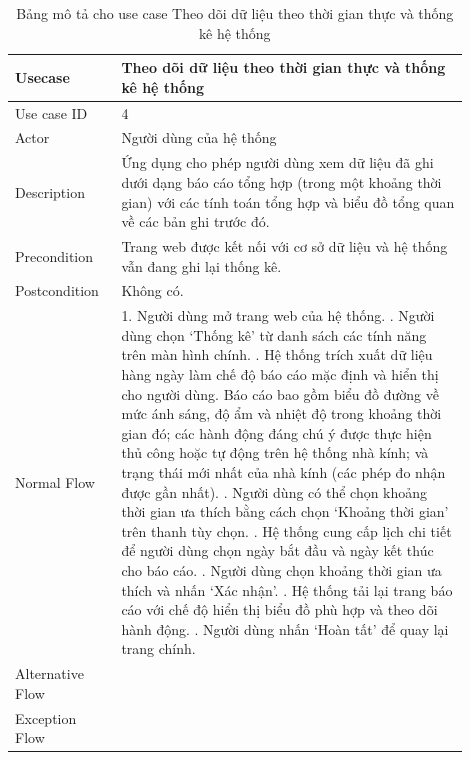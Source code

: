 \begin{table}[H]
\centering
\begin{tabular}{|p{0.2\linewidth}|p{0.7\linewidth}|}
\hline
\rowcolor[HTML]{EFEFEF} 
\textbf{Usecase}        & \textbf{Theo dõi dữ liệu theo thời gian thực và thống kê hệ thống} \\ \hline
Use case ID             & 4 \\ \hline
Actor                   & Người dùng của hệ thống \\ \hline
Description             & Ứng dụng cho phép người dùng xem dữ liệu đã ghi dưới dạng báo cáo tổng hợp (trong một khoảng thời gian) với các tính toán tổng hợp và biểu đồ tổng quan về các bản ghi trước đó. \\ \hline
Precondition            & Trang web được kết nối với cơ sở dữ liệu và hệ thống vẫn đang ghi lại thống kê. \\ \hline
Postcondition           & Không có.  \\ \hline
Normal Flow             & 
    1. Người dùng mở trang web của hệ thống. \newline
    2. Người dùng chọn `Thống kê' từ danh sách các tính năng trên màn hình chính. \newline
    3. Hệ thống trích xuất dữ liệu hàng ngày làm chế độ báo cáo mặc định và hiển thị cho người dùng. Báo cáo bao gồm biểu đồ đường về mức ánh sáng, độ ẩm và nhiệt độ trong khoảng thời gian đó; các hành động đáng chú ý được thực hiện thủ công hoặc tự động trên hệ thống nhà kính; và trạng thái mới nhất của nhà kính (các phép đo nhận được gần nhất). \newline
    4. Người dùng có thể chọn khoảng thời gian ưa thích bằng cách chọn `Khoảng thời gian' trên thanh tùy chọn. \newline
    5. Hệ thống cung cấp lịch chi tiết để người dùng chọn ngày bắt đầu và ngày kết thúc cho báo cáo. \newline
    6. Người dùng chọn khoảng thời gian ưa thích và nhấn `Xác nhận'. \newline
    7. Hệ thống tải lại trang báo cáo với chế độ hiển thị biểu đồ phù hợp và theo dõi hành động. \newline
    8. Người dùng nhấn `Hoàn tất' để quay lại trang chính.
\\ \hline
Alternative Flow          & 
\\ \hline
Exception Flow          &  
\\ \hline
\end{tabular}
\caption{Bảng mô tả cho use case Theo dõi dữ liệu theo thời gian thực và thống kê hệ thống}
\end{table}

